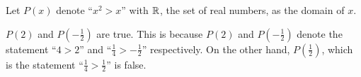 \guard



\begin{exmp}
\label{exmp:predicateOverReals}
  Let $P(x)$ denote ``$x^2 > x$'' with $\mathbb{R}$, the set of real numbers, as the domain of $x$.

  $P(2)$ and $P(-\frac{1}{2})$ are true.
  This is because $P(2)$ and $P(-\frac{1}{2})$ denote the statement ``$4 > 2$'' and ``$\frac{1}{4} > -\frac{1}{2}$'' respectively.
  On the other hand, $P(\frac{1}{2})$, which is the statement ``$\frac{1}{4}>\frac{1}{2}$'' is false.
\end{exmp}
